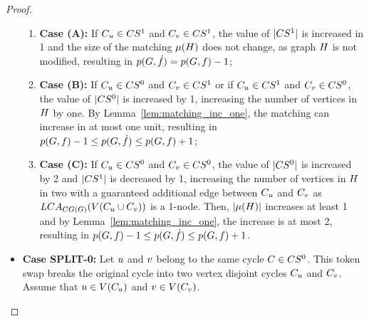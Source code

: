 \documentclass[msc,english,table,xcdraw]{ppgccufmg}
\begin{document}
\begin{proof}
\begin{itemize}
    \begin{enumerate}
        \item[] \textbf{Case (A):} If $C_{u} \in CS^{1}$ and 
        $C_{v} \in CS^{1}$, the value of $|CS^{1}|$ is
        increased in 1 and the size of the matching $\mu(H)$
        does not change, as graph $H$ is not modified, resulting in
        $p(G, \dot{f}) = p(G, f) - 1$;
        \item[] \textbf{Case (B):} If  $C_{u} \in CS^{0}$ and 
        $C_{v} \in CS^{1}$ or if  $C_{u} \in CS^{1}$ and 
        $C_{v} \in CS^{0}$, the value of $|CS^{0}|$ is
        increased by 1, increasing the number of vertices in $H$ by
        one.
        By Lemma~\ref{lem:matching_inc_one}, the matching can increase in at most
        one unit, resulting in $p(G, f) - 1 \leq p(G, \dot{f}) \leq p(G, f) + 1$;
        \item[] \textbf{Case (C):} If $C_{u} \in CS^{0}$ and 
        $C_{v} \in CS^{0}$, the value of $|CS^{0}|$
        is increased by 2 and $|CS^{1}|$ is decreased by 1, increasing
        the number of vertices in $H$ in two with a guaranteed additional
        edge between $C_{u}$ and $C_{v}$ as $LCA_{CG(G)}(V(C_{u} \cup  C_{v}))$ is a 1-node.
        Then,  $|\mu(H)|$ increases at least 1 and by Lemma~\ref{lem:matching_inc_one}, the increase is at most 2, resulting in $p(G, f) - 1 \leq p(G, \dot{f}) \leq p(G, f) + 1$.
    \end{enumerate}
    
    \item \textbf{Case SPLIT-0:} Let $u$ and $v$ belong to 
    the same cycle $C \in CS^{0}$. 
    This token swap breaks the original cycle into two vertex disjoint cycles $C_{u}$ and $C_{v}$.
    Assume that $u \in V(C_{u})$ and 
    $v \in V(C_{v})$.
    

\end{itemize}
\end{proof}
\end{document}
